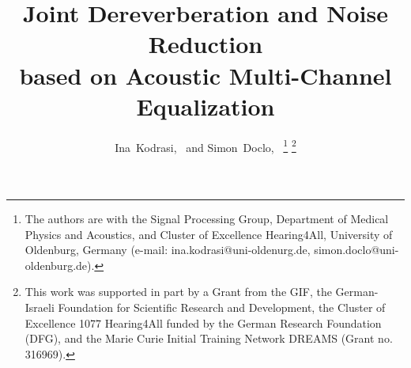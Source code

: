 \documentclass[10pt]{IEEEtran}
\begin{document}
\newlength\figureheight
\newlength\figurewidth
\setlength\figureheight{2.3cm}
\setlength{}

%
\title{Joint Dereverberation and Noise Reduction \\ based on Acoustic Multi-Channel Equalization}

\author{%
  Ina~Kodrasi,~ and Simon~Doclo,~
  \thanks{The authors are with the Signal Processing Group, Department of Medical Physics and Acoustics, and Cluster of Excellence Hearing4All, University of Oldenburg, Germany (e-mail: ina.kodrasi@uni-oldenurg.de, simon.doclo@uni-oldenburg.de).}%
  \thanks{This work was supported in part by a Grant from the GIF, the German-Israeli Foundation for Scientific Research and Development, the Cluster of Excellence 1077 Hearing4All funded by the German Research Foundation (DFG), and the Marie Curie Initial Training Network DREAMS (Grant no. 316969).}%
}
\maketitle
\newpage
\end{document}
